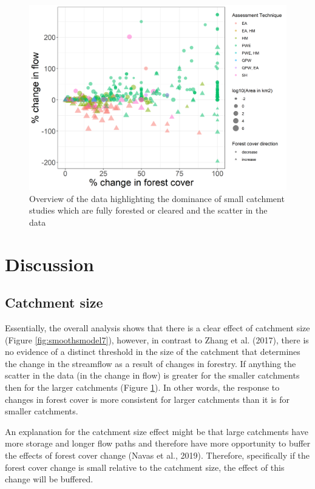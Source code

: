 \documentclass[]{elsarticle} %
\begin{document}
\begin{figure}
\includegraphics[width=0.9\linewidth]{flow_forest_byArea} \caption{Overview of the data highlighting the dominance of small catchment studies which are fully forested or cleared and the scatter in the data}\label{fig:overview}
\end{figure}

\hypertarget{discussion}{%
\section{Discussion}\label{discussion}}

\hypertarget{catchment-size}{%
\subsection{Catchment size}\label{catchment-size}}

Essentially, the overall analysis shows that there is a clear effect of catchment size (Figure \ref{fig:smoothsmodel7}), however, in contrast to Zhang et al. (2017), there is no evidence of a distinct threshold in the size of the catchment that determines the change in the streamflow as a result of changes in forestry. If anything the scatter in the data (in the change in flow) is greater for the smaller catchments then for the larger catchments (Figure \ref{fig:overview}). In other words, the response to changes in forest cover is more consistent for larger catchments than it is for smaller catchments.

An explanation for the catchment size effect might be that large catchments have more storage and longer flow paths and therefore have more opportunity to buffer the effects of forest cover change (Navas et al., 2019). Therefore, specifically if the forest cover change is small relative to the catchment size, the effect of this change will be buffered.
\end{document}
